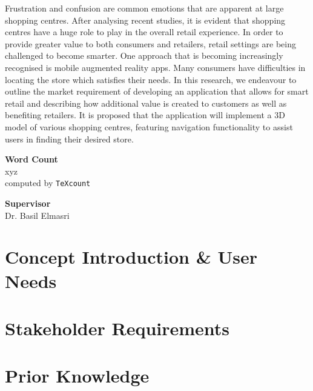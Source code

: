 \documentclass[12pt]{report}
\newcommand\blankpage{%
    \null
    \thispagestyle{empty}%
    \addtocounter{page}{-1}%
    \newpage}
\begin{document}
Frustration and confusion are common emotions that are apparent at large shopping centres. After analysing recent studies, it is evident that shopping centres have a huge role to play in the overall retail experience. In order to provide greater value to both consumers and retailers, retail settings are being challenged to become smarter. One approach that is becoming increasingly recognised is mobile augmented reality apps. Many consumers have difficulties in locating the store which satisfies their needs. In this research, we endeavour to outline the market requirement of developing an application that allows for smart retail and describing how additional value is created to customers as well as benefiting retailers. It is proposed that the application will implement a 3D model of various shopping centres, featuring navigation functionality to assist users in finding their desired store.\\

\vspace*{1.5cm}
\begin{center}    
    \large
    \textbf{Word Count}\\
    xyz\\
    \normalsize computed by \texttt{TeXcount}
\end{center}

\vspace*{1.5cm}
\begin{center}    
    \large
    \textbf{Supervisor}\\
    \normalsize Dr. Basil Elmasri
\end{center}

\tableofcontents
\afterpage{\blankpage}

\chapter{Concept Introduction \& User Needs}


\chapter{Stakeholder Requirements}


\chapter{Prior Knowledge}

\end{document}
